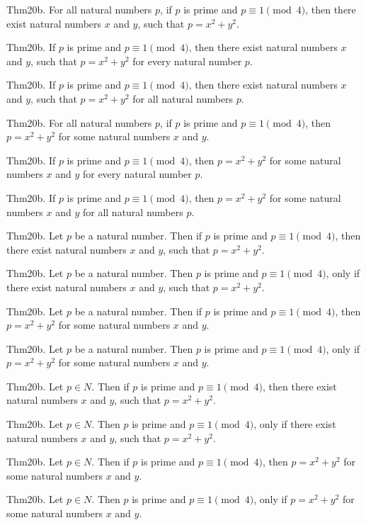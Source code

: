 \documentclass{article}
\begin{document}
Thm20b. For all natural numbers $p$, if $p$ is prime and $p \equiv 1 \pmod{ 4}$, then there exist natural numbers $x$ and $y$, such that $p = x ^{ 2}+ y ^{ 2}$.

Thm20b. If $p$ is prime and $p \equiv 1 \pmod{ 4}$, then there exist natural numbers $x$ and $y$, such that $p = x ^{ 2}+ y ^{ 2}$ for every natural number $p$.

Thm20b. If $p$ is prime and $p \equiv 1 \pmod{ 4}$, then there exist natural numbers $x$ and $y$, such that $p = x ^{ 2}+ y ^{ 2}$ for all natural numbers $p$.

Thm20b. For all natural numbers $p$, if $p$ is prime and $p \equiv 1 \pmod{ 4}$, then $p = x ^{ 2}+ y ^{ 2}$ for some natural numbers $x$ and $y$.

Thm20b. If $p$ is prime and $p \equiv 1 \pmod{ 4}$, then $p = x ^{ 2}+ y ^{ 2}$ for some natural numbers $x$ and $y$ for every natural number $p$.

Thm20b. If $p$ is prime and $p \equiv 1 \pmod{ 4}$, then $p = x ^{ 2}+ y ^{ 2}$ for some natural numbers $x$ and $y$ for all natural numbers $p$.

Thm20b. Let $p$ be a natural number. Then if $p$ is prime and $p \equiv 1 \pmod{ 4}$, then there exist natural numbers $x$ and $y$, such that $p = x ^{ 2}+ y ^{ 2}$.

Thm20b. Let $p$ be a natural number. Then $p$ is prime and $p \equiv 1 \pmod{ 4}$, only if there exist natural numbers $x$ and $y$, such that $p = x ^{ 2}+ y ^{ 2}$.

Thm20b. Let $p$ be a natural number. Then if $p$ is prime and $p \equiv 1 \pmod{ 4}$, then $p = x ^{ 2}+ y ^{ 2}$ for some natural numbers $x$ and $y$.

Thm20b. Let $p$ be a natural number. Then $p$ is prime and $p \equiv 1 \pmod{ 4}$, only if $p = x ^{ 2}+ y ^{ 2}$ for some natural numbers $x$ and $y$.

Thm20b. Let $p \in N$. Then if $p$ is prime and $p \equiv 1 \pmod{ 4}$, then there exist natural numbers $x$ and $y$, such that $p = x ^{ 2}+ y ^{ 2}$.

Thm20b. Let $p \in N$. Then $p$ is prime and $p \equiv 1 \pmod{ 4}$, only if there exist natural numbers $x$ and $y$, such that $p = x ^{ 2}+ y ^{ 2}$.

Thm20b. Let $p \in N$. Then if $p$ is prime and $p \equiv 1 \pmod{ 4}$, then $p = x ^{ 2}+ y ^{ 2}$ for some natural numbers $x$ and $y$.

Thm20b. Let $p \in N$. Then $p$ is prime and $p \equiv 1 \pmod{ 4}$, only if $p = x ^{ 2}+ y ^{ 2}$ for some natural numbers $x$ and $y$.
\end{document}
